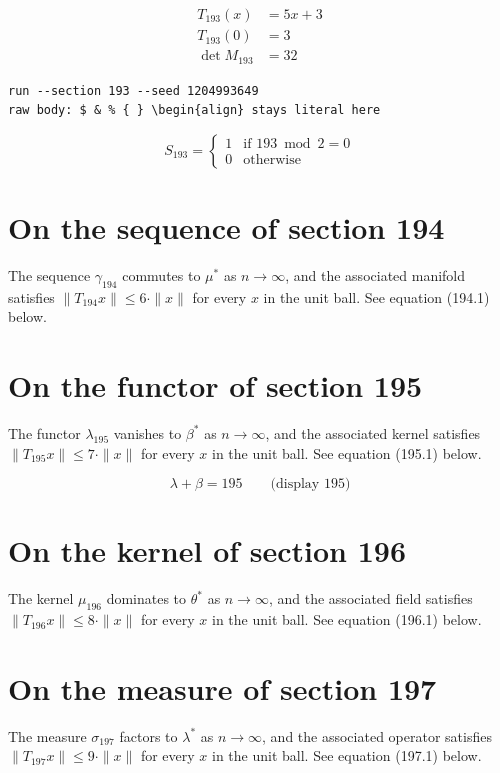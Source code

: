 \documentclass{article}
\begin{document}
\begin{align}
T_{193}(x) &= 5 x + 3 \\
T_{193}(0) &= 3 \\
\det M_{193} &= 32
\end{align}

\begin{verbatim}
run --section 193 --seed 1204993649
raw body: $ & % { } \begin{align} stays literal here
\end{verbatim}

\begin{equation}
S_{193} = \begin{cases} 1 & \text{if } 193 \bmod 2 = 0 \\ 0 & \text{otherwise} \end{cases}
\end{equation}

\section{On the sequence of section 194}
The sequence $\gamma_{194}$ commutes to $\mu^{*}$ as $n \to \infty$,
and the associated manifold satisfies $\|T_{194} x\| \leq 6 \cdot \|x\|$
for every $x$ in the unit ball. See equation (194.1) below.

\section{On the functor of section 195}
The functor $\lambda_{195}$ vanishes to $\beta^{*}$ as $n \to \infty$,
and the associated kernel satisfies $\|T_{195} x\| \leq 7 \cdot \|x\|$
for every $x$ in the unit ball. See equation (195.1) below.

$$
\lambda + \beta = 195 \qquad \text{(display 195)}
$$

\section{On the kernel of section 196}
The kernel $\mu_{196}$ dominates to $\theta^{*}$ as $n \to \infty$,
and the associated field satisfies $\|T_{196} x\| \leq 8 \cdot \|x\|$
for every $x$ in the unit ball. See equation (196.1) below.

\section{On the measure of section 197}
The measure $\sigma_{197}$ factors to $\lambda^{*}$ as $n \to \infty$,
and the associated operator satisfies $\|T_{197} x\| \leq 9 \cdot \|x\|$
for every $x$ in the unit ball. See equation (197.1) below.
\end{document}
